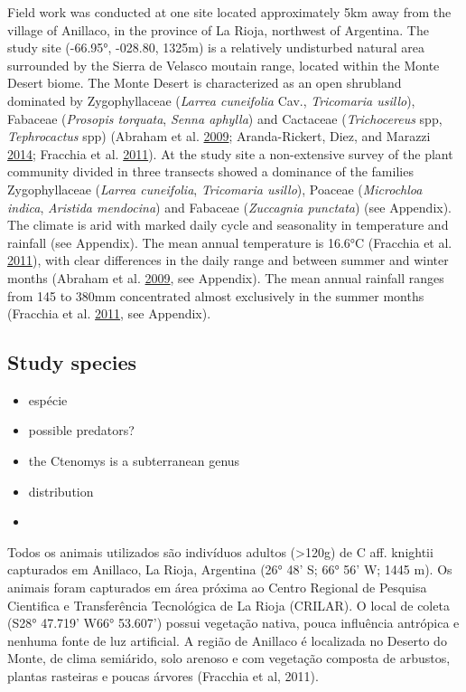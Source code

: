 \documentclass[msc,numbers,hidelinks]{coppe}
\providecommand{\tightlist}{%
  \setlength{\itemsep}{0pt}\setlength{\parskip}{0pt}}
\begin{document}
  Field work was conducted at one site located approximately 5km away from the village of Anillaco, in the province of La Rioja, northwest of Argentina. The study site (-66.95°, -028.80, 1325m) is a relatively undisturbed natural area surrounded by the Sierra de Velasco moutain range, located within the Monte Desert biome. The Monte Desert is characterized as an open shrubland dominated by Zygophyllaceae (\emph{Larrea cuneifolia} Cav., \emph{Tricomaria usillo}), Fabaceae (\emph{Prosopis torquata}, \emph{Senna aphylla}) and Cactaceae (\emph{Trichocereus} spp, \emph{Tephrocactus} spp) (Abraham et al. \protect\hyperlink{ref-abrahamOverviewGeographyMonte2009}{2009}; Aranda-Rickert, Diez, and Marazzi \protect\hyperlink{ref-aranda-rickertExtrafloralNectarFuels2014}{2014}; Fracchia et al. \protect\hyperlink{ref-fracchiaDispersalArbuscularMycorrhizal2011}{2011}). At the study site a non-extensive survey of the plant community divided in three transects showed a dominance of the families Zygophyllaceae (\emph{Larrea cuneifolia}, \emph{Tricomaria usillo}), Poaceae (\emph{Microchloa indica}, \emph{Aristida mendocina}) and Fabaceae (\emph{Zuccagnia punctata}) (see Appendix). The climate is arid with marked daily cycle and seasonality in temperature and rainfall (see Appendix). The mean annual temperature is 16.6°C (Fracchia et al. \protect\hyperlink{ref-fracchiaDispersalArbuscularMycorrhizal2011}{2011}), with clear differences in the daily range and between summer and winter months (Abraham et al. \protect\hyperlink{ref-abrahamOverviewGeographyMonte2009}{2009}, see Appendix).
  The mean annual rainfall ranges from 145 to 380mm concentrated almost exclusively in the summer months (Fracchia et al. \protect\hyperlink{ref-fracchiaDispersalArbuscularMycorrhizal2011}{2011}, see Appendix).

  \hypertarget{study-species}{%
  \subsection{Study species}\label{study-species}}
  \begin{itemize}
  \tightlist
  \item
    espécie
  \item
    possible predators?
  \item
    the Ctenomys is a subterranean genus
  \item
    distribution
  \item
  \end{itemize}
  Todos os animais utilizados são indivíduos adultos (\textgreater120g) de C aff. knightii capturados em Anillaco, La Rioja, Argentina (26° 48' S; 66° 56' W; 1445 m). Os animais foram capturados em área próxima ao Centro Regional de Pesquisa Cientifica e Transferência Tecnológica de La Rioja (CRILAR). O local de coleta (S28° 47.719' W66° 53.607') possui vegetação nativa, pouca influência antrópica e nenhuma fonte de luz artificial. A região de Anillaco é localizada no Deserto do Monte, de clima semiárido, solo arenoso e com vegetação composta de arbustos, plantas rasteiras e poucas árvores (Fracchia et al, 2011).
\end{document}
